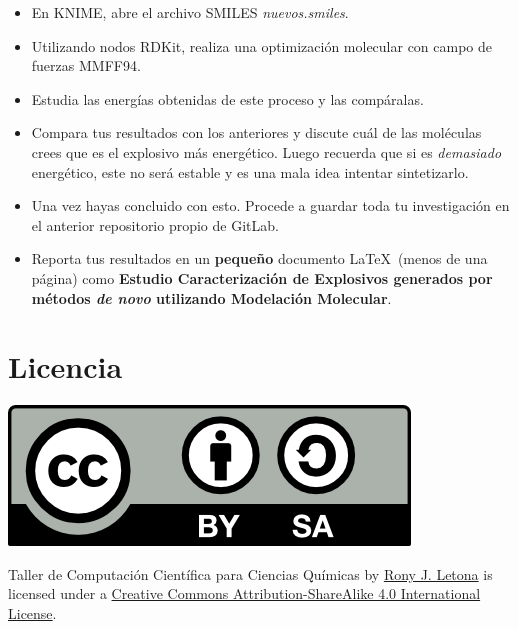 \documentclass[10pt,letterpaper]{article}
\begin{document}
\begin{itemize}
\item En KNIME, abre el archivo SMILES \textit{nuevos.smiles}.
\item Utilizando nodos RDKit, realiza una optimizaci\'on molecular con campo de fuerzas MMFF94.
\item Estudia las energ\'ias obtenidas de este proceso y las comp\'aralas.
\item Compara tus resultados con los anteriores y discute cu\'al de las mol\'eculas crees que es el explosivo m\'as energ\'etico. Luego recuerda que si es \emph{demasiado} energ\'etico, este no ser\'a estable y es una mala idea intentar sintetizarlo.
\item Una vez hayas concluido con esto. Procede a guardar toda tu investigaci\'on en el anterior repositorio propio de GitLab.
\item Reporta tus resultados en un \textbf{peque\~no} documento \LaTeX\ (menos de una p\'agina) como \textbf{Estudio Caracterizaci\'on de Explosivos generados por m\'etodos \emph{de novo} utilizando Modelaci\'on Molecular}.
\end{itemize}

\section*{Licencia}

\noindent \includegraphics{img/cc_big.png}

\noindent Taller de Computaci\'on Cient\'ifica para Ciencias Qu\'imicas by \href{http://github.com/zronyj/TC3Q}{Rony J. Letona} is licensed under a \href{http://creativecommons.org/licenses/by-sa/4.0/}{Creative Commons Attribution-ShareAlike 4.0 International License}.
\end{document}
